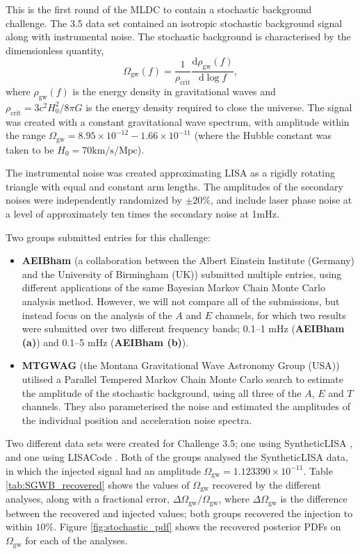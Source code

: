 \documentclass{iopart}
\begin{document}
This is the first round of the MLDC to contain a stochastic background challenge.
The 3.5 data set contained an isotropic stochastic background signal
along with instrumental noise. The stochastic background is characterised
by the dimensionless quantity,
\begin{equation}
\Omega_{\mathrm{gw}}(f)=\frac{1}{\rho_{\mathrm{crit}}}\frac{\mathrm{d} \rho_{\mathrm{gw}}(f)}{\mathrm{d} \log{f}},
\end{equation}
where $\rho_{\mathrm{gw}}(f)$ is the energy density in gravitational waves
and $\rho_{\mathrm{crit}}=3c^2H_0^2/8\pi G$ is the energy density required
to close the universe. 
The signal was created with a constant
gravitational wave spectrum, 
with amplitude within the range $\Omega_{\mathrm{gw}} = 8.95\times 10^{-12} - 1.66\times 10^{-11}$
(where the Hubble constant was taken to be $H_0=70 \mathrm{km}/\mathrm{s}/\mathrm{Mpc}$).

The instrumental noise was created approximating LISA as a rigidly rotating
triangle with equal and constant arm lengths.
The amplitudes of the 
secondary noises were independently randomized  by $\pm 20\%$,
and include laser phase noise at a level of approximately ten times the secondary 
noise at 1mHz.

Two groups submitted entries for this challenge:
\begin{itemize}
\item \textbf{AEIBham} (a collaboration between the Albert Einstein Institute
(Germany) and the University of Birmingham (UK)) submitted multiple entries,
using different applications of the same Bayesian Markov Chain Monte Carlo
analysis method. However, we will not compare all of the submissions, but
instead focus on the analysis of the $A$ and $E$ channels, for which two results were submitted
over two different frequency bands; 0.1--1 mHz (\textbf{AEIBham (a)})
and 0.1--5 mHz (\textbf{AEIBham (b)}).
\item \textbf{MTGWAG} (the Montana Gravitational Wave Astronomy Group (USA)) 
utilised a Parallel Tempered Markov Chain Monte Carlo search to
estimate the amplitude of the stochastic background, using all three of the 
$A$, $E$ and $T$ channels. They also parameterised
the noise and estimated the amplitudes of the individual position and 
acceleration noise spectra.
\end{itemize}

Two different data sets were created for Challenge 3.5; one using 
SyntheticLISA \cite{}, and one using LISACode \cite{}. Both of the groups 
analysed the SyntheticLISA data, in which the injected signal had
an amplitude
$\Omega_{\mathrm{gw}}=1.123390\times 10^{-11}$. Table \ref{tab:SGWB_recovered}
shows the values of $\Omega_{\mathrm{gw}}$ recovered by the different
analyses, along with a fractional error, 
$\Delta \Omega_{\mathrm{gw}}/\Omega_{\mathrm{gw}}$,
where $\Delta \Omega_{\mathrm{gw}}$ is the difference between the recovered
and injected values; both groups recovered the injection
to within $10\%$. 
Figure \ref{fig:stochastic_pdf} shows the recovered posterior PDFs on 
$\Omega_{\mathrm{gw}}$ for each of the analyses. 
\end{document}
